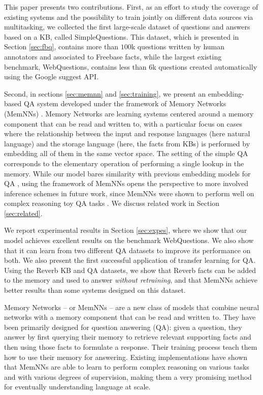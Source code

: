 \documentclass[11pt,a4paper]{article}
\newcommand{\fb}{{\sf Freebase}\xspace}
\newcommand{\wq}{{\sf WebQuestions}\xspace}
\newcommand{\rv}{{\sf Reverb}\xspace}
\newcommand{\fbq}{{\sf SimpleQuestions}\xspace}
\begin{document}
This paper presents two contributions. First, as an effort to study
the coverage of existing systems and the possibility to train jointly
on different data sources via multitasking, we collected the first
large-scale dataset of questions and answers based on a KB, called
\fbq. This dataset, which is presented in Section \ref{sec:fbq},
contains more than $100$k questions written by human annotators and
associated to \fb facts, while the largest existing benchmark, \wq,
contains less than $6$k questions created automatically using the
Google suggest API.

Second, in sections \ref{sec:memnn} and \ref{sec:training}, we present
an embedding-based QA system developed under the framework of Memory
Networks (MemNNs) \cite{weston2014memory,sukhbaatar2015weakly}. Memory
Networks are learning systems centered around a memory component that
can be read and written to, with a particular focus on cases where the
relationship between the input and response languages (here natural
language) and the storage language (here, the facts from KBs) is
performed by embedding all of them in the same vector space. The
setting of the simple QA corresponds to the elementary operation of
performing a single lookup in the memory. While our model bares
similarity with previous embedding models for QA
\cite{bordes2014open,bordes-chopra-weston:2014:EMNLP2014}, using the
framework of MemNNs opens the perspective to more involved inference
schemes in future work, since MemNNs were shown to perform well on
complex reasoning toy QA tasks \cite{weston2014memory}. We discuss
related work in Section \ref{sec:related}.

We report experimental results in Section \ref{sec:expes},
where we show that our model achieves excellent results on the
benchmark \wq. We also show that it can learn from two different QA
datasets to improve its performance on both. We also present the first
successful application of transfer learning for QA. Using the \rv KB
and QA datasets, we show that \rv facts can be added to the memory and
used to answer {\it without retraining}, and that MemNNs achieve
better results than some systems designed on this dataset.


Memory Networks \cite{weston2014memory} -- or MemNNs -- are a new class of models that
combine neural networks with a memory component that can be
read and written to.
They have been primarily designed for question answering (QA): given a
question, they answer by first querying their memory to retrieve
relevant supporting facts and then using those facts to formulate a response.
Their training process teach them how to use their memory for answering.
Existing implementations
\cite{weston2014memory,weston2015towards,sukhbaatar2015weakly} have
shown that MemNNs are able to learn to perform complex reasoning on
various tasks and with various degrees of supervision, making them a
very promising method for eventually understanding language at scale.
\end{document}
